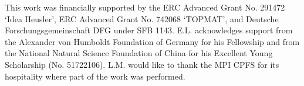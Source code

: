 \documentclass[aps,prb,reprint,superscriptaddress,amssymb,amsmath]{revtex4-1}
\begin{document}
This work was financially supported by the ERC Advanced Grant No. 291472 `Idea Heusler', 
ERC Advanced Grant No. 742068 `TOPMAT', and Deutsche Forschungsgemeinschaft DFG under 
SFB 1143. E.L. acknowledges support from the Alexander von Humboldt Foundation of Germany 
for his Fellowship and from the National Natural Science Foundation of China for his 
Excellent Young Scholarship (No. 51722106). L.M. would like to thank the MPI CPFS for 
its hospitality where part of the work was performed.


\end{document}
